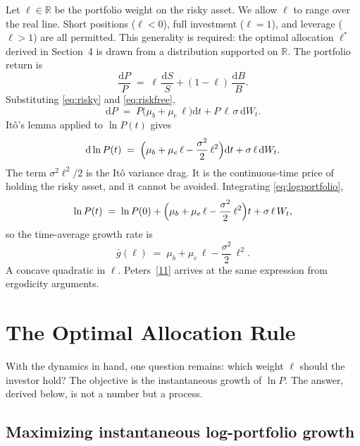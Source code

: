 \documentclass[11pt]{article}
\newcommand{\lopt}{\ell^{*}}
\newcommand{\mue}{\mu_{e}}
\newcommand{\mub}{\mu_{b}}
\newcommand{\dd}{\mathrm{d}}
\begin{document}
Let $\ell \in \mathbb{R}$ be the portfolio weight on the risky asset.
We allow $\ell$ to range over the real line. Short positions
($\ell < 0$), full investment ($\ell = 1$), and leverage ($\ell > 1$)
are all permitted. This generality is required: the optimal allocation
$\lopt$ derived in Section~4 is drawn from a distribution supported
on $\mathbb{R}$. The portfolio return is
\begin{equation}
  \frac{\dd P}{P} \;=\; \ell\,\frac{\dd S}{S}
  + (1-\ell)\,\frac{\dd B}{B}.
  \label{eq:portfolio}
\end{equation}
Substituting \eqref{eq:risky} and \eqref{eq:riskfree},
\begin{equation}
  \dd P \;=\; P\bigl(\mub + \mue\,\ell\bigr)\dd t
  + P\,\ell\,\sigma\,\dd W_{t}.
  \label{eq:portfoliosde}
\end{equation}
It\^{o}'s lemma applied to $\ln P(t)$ gives
\begin{equation}
  \dd\ln P(t) \;=\; \Bigl(\mub + \mue\,\ell
  - \frac{\sigma^{2}}{2}\,\ell^{2}\Bigr)\dd t
  + \sigma\,\ell\,\dd W_{t}.
  \label{eq:logportfolio}
\end{equation}
The term $\sigma^{2}\ell^{2}/2$ is the It\^{o} variance drag. It is
the continuous-time price of holding the risky asset, and it cannot
be avoided. Integrating \eqref{eq:logportfolio},
\begin{equation}
  \ln P(t) \;=\; \ln P(0) + \Bigl(\mub + \mue\,\ell
  - \frac{\sigma^{2}}{2}\,\ell^{2}\Bigr)t
  + \sigma\,\ell\,W_{t},
  \label{eq:logwealth}
\end{equation}
so the time-average growth rate is
\begin{equation}
  \bar{g}(\ell) \;=\; \mub + \mue\,\ell
  - \frac{\sigma^{2}}{2}\,\ell^{2}.
  \label{eq:growthrate}
\end{equation}
A concave quadratic in $\ell$. Peters~[\hyperlink{ref:11}{11}] arrives at the same
expression from ergodicity arguments.

\section{The Optimal Allocation Rule}

With the dynamics in hand, one question remains: which weight $\ell$
should the investor hold? The objective is the instantaneous growth of
$\ln P$. The answer, derived below, is not a number but a process.

\subsection{Maximizing instantaneous log-portfolio growth}
\end{document}
